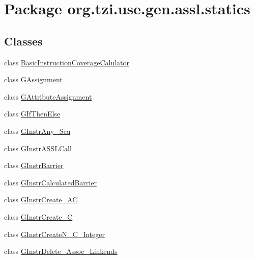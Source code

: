 \hypertarget{namespaceorg_1_1tzi_1_1use_1_1gen_1_1assl_1_1statics}{\section{Package org.\-tzi.\-use.\-gen.\-assl.\-statics}
\label{namespaceorg_1_1tzi_1_1use_1_1gen_1_1assl_1_1statics}
}
\subsection*{Classes}
\begin{DoxyCompactItemize}
\item 
class \hyperlink{classorg_1_1tzi_1_1use_1_1gen_1_1assl_1_1statics_1_1_basic_instruction_coverage_calulator}{Basic\-Instruction\-Coverage\-Calulator}
\item 
class \hyperlink{classorg_1_1tzi_1_1use_1_1gen_1_1assl_1_1statics_1_1_g_assignment}{G\-Assignment}
\item 
class \hyperlink{classorg_1_1tzi_1_1use_1_1gen_1_1assl_1_1statics_1_1_g_attribute_assignment}{G\-Attribute\-Assignment}
\item 
class \hyperlink{classorg_1_1tzi_1_1use_1_1gen_1_1assl_1_1statics_1_1_g_if_then_else}{G\-If\-Then\-Else}
\item 
class \hyperlink{classorg_1_1tzi_1_1use_1_1gen_1_1assl_1_1statics_1_1_g_instr_any___seq}{G\-Instr\-Any\-\_\-\-Seq}
\item 
class \hyperlink{classorg_1_1tzi_1_1use_1_1gen_1_1assl_1_1statics_1_1_g_instr_a_s_s_l_call}{G\-Instr\-A\-S\-S\-L\-Call}
\item 
class \hyperlink{classorg_1_1tzi_1_1use_1_1gen_1_1assl_1_1statics_1_1_g_instr_barrier}{G\-Instr\-Barrier}
\item 
class \hyperlink{classorg_1_1tzi_1_1use_1_1gen_1_1assl_1_1statics_1_1_g_instr_calculated_barrier}{G\-Instr\-Calculated\-Barrier}
\item 
class \hyperlink{classorg_1_1tzi_1_1use_1_1gen_1_1assl_1_1statics_1_1_g_instr_create___a_c}{G\-Instr\-Create\-\_\-\-A\-C}
\item 
class \hyperlink{classorg_1_1tzi_1_1use_1_1gen_1_1assl_1_1statics_1_1_g_instr_create___c}{G\-Instr\-Create\-\_\-\-C}
\item 
class \hyperlink{classorg_1_1tzi_1_1use_1_1gen_1_1assl_1_1statics_1_1_g_instr_create_n___c___integer}{G\-Instr\-Create\-N\-\_\-\-C\-\_\-\-Integer}
\item 
class \hyperlink{classorg_1_1tzi_1_1use_1_1gen_1_1assl_1_1statics_1_1_g_instr_delete___assoc___linkends}{G\-Instr\-Delete\-\_\-\-Assoc\-\_\-\-Linkends}

\end{DoxyCompactItemize}

